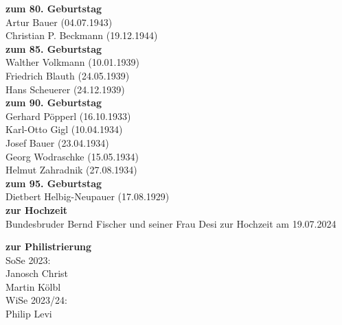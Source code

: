 {\begin{multicols}{2}
\columnbreak

\textbf{zum 80. Geburtstag}\\
Artur Bauer (04.07.1943)\\
Christian P. Beckmann (19.12.1944)\\


\textbf{zum 85. Geburtstag}\\
Walther Volkmann (10.01.1939)\\
Friedrich Blauth (24.05.1939)\\
Hans Scheuerer (24.12.1939)\\


\textbf{zum 90. Geburtstag}\\
Gerhard Pöpperl (16.10.1933)\\
Karl-Otto Gigl (10.04.1934)\\
Josef Bauer (23.04.1934)\\
Georg Wodraschke (15.05.1934)\\
Helmut Zahradnik (27.08.1934)\\


\textbf{zum 95. Geburtstag}\\
Dietbert Helbig-Neupauer (17.08.1929)\\





\textbf{zur Hochzeit}\\
Bundesbruder Bernd Fischer und seiner Frau Desi
zur Hochzeit am 19.07.2024


\vspace{1.5mm}







\textbf{zur Philistrierung}\\
SoSe 2023:\\
Janosch Christ\\
Martin Kölbl\\
\newline
WiSe 2023/24:\\
Philip Levi



\end{multicols}}
